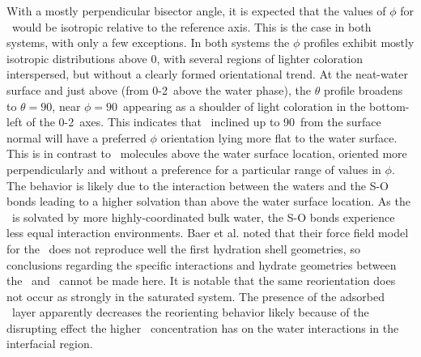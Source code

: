 \documentclass{article}
\begin{document}

 With a mostly perpendicular bisector angle, it is expected that the values of $\phi$ for \suldiox~would be isotropic relative to the reference axis. This is the case in both systems, with only a few exceptions. In both systems the $\phi$ profiles exhibit mostly isotropic distributions above 0\angs, with several regions of lighter coloration interspersed, but without a clearly formed orientational trend. At the neat-water surface and just above (from 0-2\angs~above the water phase), the $\theta$ profile broadens to $\theta = 90$\textdegree, near $\phi = 90$\textdegree~appearing as a shoulder of light coloration in the bottom-left of the 0-2\angs~axes. This indicates that \suldiox~inclined up to 90\textdegree~from the surface normal will have a preferred $\phi$ orientation lying more flat to the water surface. This is in contrast to \suldiox~molecules above the water surface location, oriented more perpendicularly and without a preference for a particular range of values in $\phi$. The behavior is likely due to the interaction between the waters and the S-O bonds leading to a higher solvation than above the water surface location. As the \suldiox~is solvated by more highly-coordinated bulk water, the S-O bonds experience less equal interaction environments. Baer et al. noted that their force field model for the \suldiox~does not reproduce well the first hydration shell geometries,\cite{Baer2010} so conclusions regarding the specific interactions and hydrate geometries between the \suldiox~and \wat~cannot be made here. It is notable that the same reorientation does not occur as strongly in the saturated system. The presence of the adsorbed \suldiox~layer apparently decreases the reorienting behavior likely because of the disrupting effect the higher \suldiox~concentration has on the water interactions in the interfacial region. %

\end{document}

